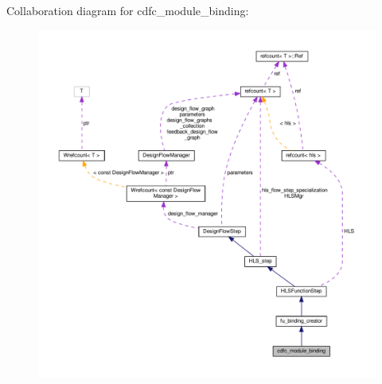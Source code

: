 Collaboration diagram for cdfc\+\_\+module\+\_\+binding\+:
\nopagebreak
\begin{figure}[H]
\begin{center}
\leavevmode
\includegraphics[width=350pt]{d5/d7f/classcdfc__module__binding__coll__graph}
\end{center}
\end{figure}
